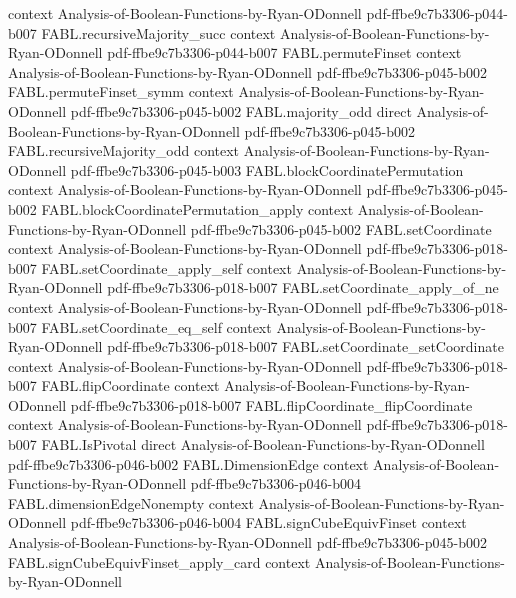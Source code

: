 \begin{theorem}
  {context}
  {Analysis-of-Boolean-Functions-by-Ryan-ODonnell}
  {pdf-ffbe9c7b3306-p044-b007}
\proofstep
  {FABL.recursiveMajority_succ}
  {context}
  {Analysis-of-Boolean-Functions-by-Ryan-ODonnell}
  {pdf-ffbe9c7b3306-p044-b007}
\proofstep
  {FABL.permuteFinset}
  {context}
  {Analysis-of-Boolean-Functions-by-Ryan-ODonnell}
  {pdf-ffbe9c7b3306-p045-b002}
\proofstep
  {FABL.permuteFinset_symm}
  {context}
  {Analysis-of-Boolean-Functions-by-Ryan-ODonnell}
  {pdf-ffbe9c7b3306-p045-b002}
\proofstep
  {FABL.majority_odd}
  {direct}
  {Analysis-of-Boolean-Functions-by-Ryan-ODonnell}
  {pdf-ffbe9c7b3306-p045-b002}
\proofstep
  {FABL.recursiveMajority_odd}
  {context}
  {Analysis-of-Boolean-Functions-by-Ryan-ODonnell}
  {pdf-ffbe9c7b3306-p045-b003}
\proofstep
  {FABL.blockCoordinatePermutation}
  {context}
  {Analysis-of-Boolean-Functions-by-Ryan-ODonnell}
  {pdf-ffbe9c7b3306-p045-b002}
\proofstep
  {FABL.blockCoordinatePermutation_apply}
  {context}
  {Analysis-of-Boolean-Functions-by-Ryan-ODonnell}
  {pdf-ffbe9c7b3306-p045-b002}
\proofstep
  {FABL.setCoordinate}
  {context}
  {Analysis-of-Boolean-Functions-by-Ryan-ODonnell}
  {pdf-ffbe9c7b3306-p018-b007}
\proofstep
  {FABL.setCoordinate_apply_self}
  {context}
  {Analysis-of-Boolean-Functions-by-Ryan-ODonnell}
  {pdf-ffbe9c7b3306-p018-b007}
\proofstep
  {FABL.setCoordinate_apply_of_ne}
  {context}
  {Analysis-of-Boolean-Functions-by-Ryan-ODonnell}
  {pdf-ffbe9c7b3306-p018-b007}
\proofstep
  {FABL.setCoordinate_eq_self}
  {context}
  {Analysis-of-Boolean-Functions-by-Ryan-ODonnell}
  {pdf-ffbe9c7b3306-p018-b007}
\proofstep
  {FABL.setCoordinate_setCoordinate}
  {context}
  {Analysis-of-Boolean-Functions-by-Ryan-ODonnell}
  {pdf-ffbe9c7b3306-p018-b007}
\proofstep
  {FABL.flipCoordinate}
  {context}
  {Analysis-of-Boolean-Functions-by-Ryan-ODonnell}
  {pdf-ffbe9c7b3306-p018-b007}
\proofstep
  {FABL.flipCoordinate_flipCoordinate}
  {context}
  {Analysis-of-Boolean-Functions-by-Ryan-ODonnell}
  {pdf-ffbe9c7b3306-p018-b007}
\proofstep
  {FABL.IsPivotal}
  {direct}
  {Analysis-of-Boolean-Functions-by-Ryan-ODonnell}
  {pdf-ffbe9c7b3306-p046-b002}
\proofstep
  {FABL.DimensionEdge}
  {context}
  {Analysis-of-Boolean-Functions-by-Ryan-ODonnell}
  {pdf-ffbe9c7b3306-p046-b004}
\proofstep
  {FABL.dimensionEdgeNonempty}
  {context}
  {Analysis-of-Boolean-Functions-by-Ryan-ODonnell}
  {pdf-ffbe9c7b3306-p046-b004}
\proofstep
  {FABL.signCubeEquivFinset}
  {context}
  {Analysis-of-Boolean-Functions-by-Ryan-ODonnell}
  {pdf-ffbe9c7b3306-p045-b002}
\proofstep
  {FABL.signCubeEquivFinset_apply_card}
  {context}
  {Analysis-of-Boolean-Functions-by-Ryan-ODonnell}

\end{theorem}
